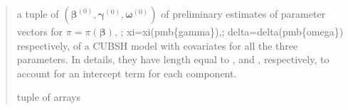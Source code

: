 \documentclass[letterpaper,10pt,english]{sphinxmanual}
\begin{document}
\begin{fulllineitems}
\begin{quote}
\begin{description}
\begin{itemize}
\end{itemize}

\sphinxAtStartPar
a tuple of \((\pmb \beta^{(0)}, \pmb \gamma^{(0)}, \pmb \omega^{(0)})\) of preliminary estimates of parameter vectors for 
\(\pi = \pi(\pmb{\beta})\), ; xi=xi(pmb\{gamma\}),; delta=delta(pmb\{omega\})\textasciigrave{} respectively, of a CUBSH model with covariates for all the three
parameters. In details, they have length equal to ,  and
, respectively, to account for an intercept term for each component.

\sphinxAtStartPar
tuple of arrays

\end{description}\end{quote}

\end{fulllineitems}

\end{document}
